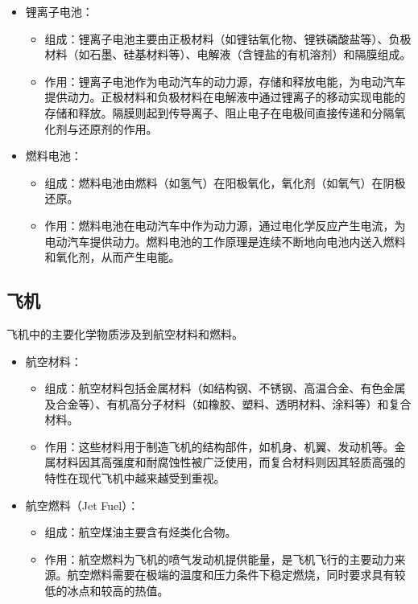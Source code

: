 \documentclass[UTF8]{report}
\theoremstyle{MyLineTheoremStyle} %
\theoremstyle{MyBlockTheoremStyle} %
\theoremstyle{MySubsubsectionStyle} %
\begin{document}
\begin{itemize}
    \item 锂离子电池：
    \begin{itemize}
        \item 组成：锂离子电池主要由正极材料（如锂钴氧化物、锂铁磷酸盐等）、负极材料（如石墨、硅基材料等）、电解液（含锂盐的有机溶剂）和隔膜组成。
        \item 作用：锂离子电池作为电动汽车的动力源，存储和释放电能，为电动汽车提供动力。正极材料和负极材料在电解液中通过锂离子的移动实现电能的存储和释放。隔膜则起到传导离子、阻止电子在电极间直接传递和分隔氧化剂与还原剂的作用。
    \end{itemize}
    \item 燃料电池：
    \begin{itemize}
        \item 组成：燃料电池由燃料（如氢气）在阳极氧化，氧化剂（如氧气）在阴极还原。
        \item 作用：燃料电池在电动汽车中作为动力源，通过电化学反应产生电流，为电动汽车提供动力。燃料电池的工作原理是连续不断地向电池内送入燃料和氧化剂，从而产生电能。
    \end{itemize}
\end{itemize}

\subsection{飞机}

飞机中的主要化学物质涉及到航空材料和燃料。

\begin{itemize}
    \item 航空材料：
    \begin{itemize}
        \item 组成：航空材料包括金属材料（如结构钢、不锈钢、高温合金、有色金属及合金等）、有机高分子材料（如橡胶、塑料、透明材料、涂料等）和复合材料。
        \item 作用：这些材料用于制造飞机的结构部件，如机身、机翼、发动机等。金属材料因其高强度和耐腐蚀性被广泛使用，而复合材料则因其轻质高强的特性在现代飞机中越来越受到重视。
    \end{itemize}
    \item 航空燃料（Jet Fuel）：
    \begin{itemize}
        \item 组成：航空煤油主要含有烃类化合物。
        \item 作用：航空燃料为飞机的喷气发动机提供能量，是飞机飞行的主要动力来源。航空燃料需要在极端的温度和压力条件下稳定燃烧，同时要求具有较低的冰点和较高的热值。
    \end{itemize}
\end{itemize}
\end{document}
